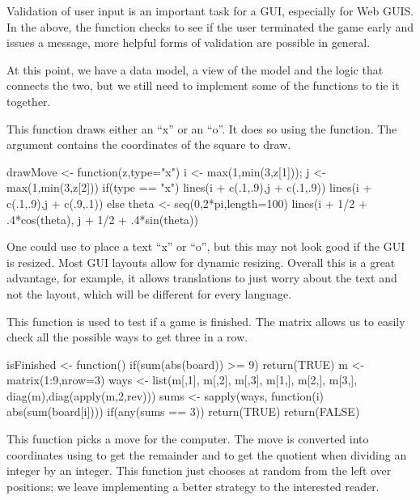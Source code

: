 Validation of user input is an important task for a GUI, especially
for Web GUIS. In the above,
the  function checks to see if the user
terminated the game early and issues a message, more helpful forms of
validation are possible in general.

At this point, we have a data model, a view of the model and the
logic that connects the two, but we still need to implement some of the
functions to tie it together.


This function draws either an ``x'' or an ``o''. It does so using the
 function. The  argument contains the
coordinates of the square to draw.
\begin{Schunk}
\begin{Sinput}
 drawMove <- function(z,type="x") {
   i <- max(1,min(3,z[1])); j <- max(1,min(3,z[2]))
   if(type == "x") {
     lines(i + c(.1,.9),j + c(.1,.9))
     lines(i + c(.1,.9),j + c(.9,.1))
   } else {
     theta <- seq(0,2*pi,length=100)
     lines(i + 1/2 + .4*cos(theta), j + 1/2 + .4*sin(theta))
   }
 }
\end{Sinput}
\end{Schunk}

One could use  to place a text ``x'' or ``o'', but this may
not look good if the GUI is resized. Most GUI layouts allow for
dynamic resizing. Overall this is a great advantage, for example, it
allows translations to just worry about the text and not the layout,
which will be different for every language.

This function is used to test if a game is finished. The matrix
 allows us to easily check all the possible ways to get three
in a row.
\begin{Schunk}
\begin{Sinput}
 isFinished <- function() {
   if(sum(abs(board)) >= 9) 
     return(TRUE)
   m <- matrix(1:9,nrow=3)
   ways <- list(m[,1], m[,2], m[,3],
                m[1,], m[2,], m[3,],
                diag(m),diag(apply(m,2,rev)))
   sums <- sapply(ways, function(i) abs(sum(board[i])))
   if(any(sums == 3)) 
     return(TRUE)
   return(FALSE)
 }
\end{Sinput}
\end{Schunk}

This function picks a move for the computer.  The move is converted
into coordinates using \code{\%\%} to get the remainder and
\code{\%/\%} to get the quotient when dividing an integer by an
integer. This function just chooses at random from the left over
positions; we leave implementing a better strategy to the interested
reader.

